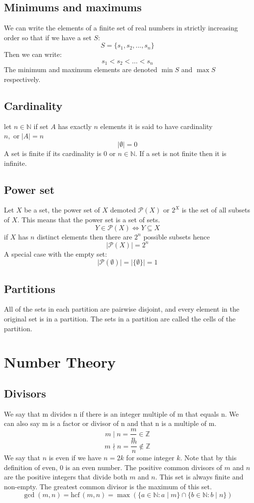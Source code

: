 \documentclass[12pt]{article}
\begin{document}
\subsection*{Minimums and maximums}
We can write the elements of a finite set of real numbers in strictly increasing order so that if we have a set \(S\):
\[S=\{s_1,s_2,...,s_n\}\]
Then we can write:
\[s_1<s_2<\dots<s_n\]
The minimum and maximum elements are denoted \(\min S\) and \(\max S\) respectively.
\subsection*{Cardinality}
let \(n\in\mathbb{N}\) if set \(A\) has exactly \(n\) elements it is said to have cardinality \(n,\text{ or}\;\vert A\vert=n\)
\[\vert\emptyset\vert=0\]
A set is finite if its cardinality is 0 or \(n\in\mathbb{N}\). If a set is not finite then it is infinite.
\subsection*{Power set}
Let \(X\) be a set, the power set of \(X\) demoted \(\mathcal{P}(X)\) or \(2^X\) is the set of all subsets of \(X\). This means that the power set is a set of sets.
\[Y\in \mathcal{P}(X) \iff Y\subseteq X\]
if \(X\) has \(n\) distinct elements then there are \(2^n\) possible subsets hence
\[\vert\mathcal{P}(X)\vert=2^n\]
A special case with the empty set:
\[\vert\mathcal{P}(\emptyset)\vert=\vert\{\emptyset\}\vert=1\]
\subsection*{Partitions}
All of the sets in each partition are pairwise disjoint, and every element in the original set is in a partition. The sets in a partition are called the cells of the partition.
\section{Number Theory}
\subsection*{Divisors}
We say that m divides n if there is an integer multiple of m that equals n. We can also say m is a factor or divisor of n and that n is a multiple of m.
\[m\mid n=\frac{m}{n}\in\mathbb{Z}\]
\[m\nmid n=\frac{m}{n}\not\in\mathbb{Z}\]
We say that \(n\) is even if we have \(n=2k\) for some integer \(k\). Note that by this definition of even, 0 is an even number. The positive common divisors of \(m\) and \(n\) are the positive integers that divide both \(m\) and \(n\). This set is always finite and non-empty. The greatest common divisor is the maximum of this set.
\[\gcd (m,n)=\text{hcf}\,(m,n)=\max (\{a\in\mathbb{N}:a\mid m\}\cap\{b\in \mathbb{N}:b\mid n\})\]
\end{document}
